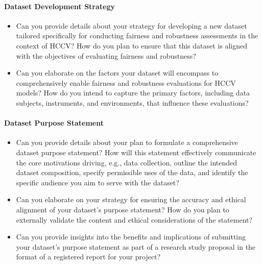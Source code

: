 \paragraph{Dataset Development Strategy}
\begin{itemize}
    \item Can you provide details about your strategy for developing a new dataset tailored
    specifically for conducting fairness and robustness assessments in the context of HCCV?
    How do you plan to ensure that this dataset is aligned with the objectives of evaluating
    fairness and robustness?
    \item Can you elaborate on the factors your dataset will encompass to comprehensively
    enable fairness and robustness evaluations for HCCV models? How do you intend to capture
    the primary factors, including data subjects, instruments, and environments, that
    influence these evaluations?
\end{itemize}

\paragraph{Dataset Purpose Statement} 
\begin{itemize}
    \item Can you provide details about your plan to formulate a comprehensive dataset
    purpose statement? How will this statement effectively communicate the core
    motivations driving, e.g., data collection, outline the intended dataset
    composition, specify permissible uses of the data, and identify the specific
    audience you aim to serve with the dataset?
    \item Can you elaborate on your strategy for ensuring the accuracy and ethical
    alignment of your dataset's purpose statement? How do you plan to externally
    validate the content and ethical considerations of the statement?
    \item Can you provide insights into the benefits and implications of submitting
    your dataset's purpose statement as part of a research study proposal in the format
    of a registered report for your project?
\end{itemize}

